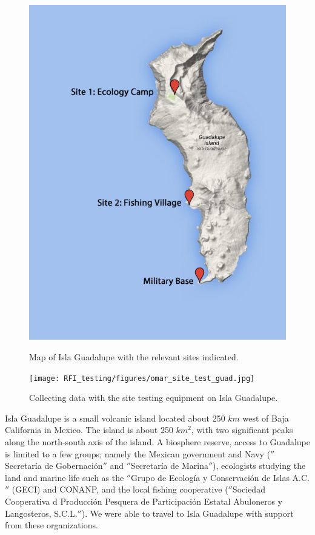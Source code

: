 \begin{figure}[htb]
\centering
\begin{minipage}[b]{0.47\textwidth}
\centering
\includegraphics[width=0.95\linewidth]{RFI_testing/figures/isla_guadalupe_site_map.jpg}
\caption{Map of Isla Guadalupe with the relevant sites indicated.}
\label{Fig:guadmap}
\end{minipage}%
\begin{minipage}[b]{0.02\textwidth}
\hspace{1cm}
\end{minipage}%
\begin{minipage}[b]{0.47\textwidth}
\centering
\texttt{[image: RFI\_testing/figures/omar\_site\_test\_guad.jpg]}
\caption{Collecting data with the site testing equipment on Isla Guadalupe.}
\label{Fig:guadsite}
\end{minipage}
\end{figure}

Isla Guadalupe is a small volcanic island located about 250 $km$ west of Baja California in Mexico. The island is about 250 $km^2$, with two significant peaks along the north-south axis of the island. A biosphere reserve, access to Guadalupe is limited to a few groups; namely the Mexican government and Navy ($''$Secretar\'{i}a de Gobernaci\'{o}n$''$ and $''$Secretar\'{i}a de Marina$''$), ecologists studying the land and marine life such as the $''$Grupo de Ecolog\'{i}a y Conservaci\'{o}n de Islas A.C.$''$ (GECI) and CONANP, and the local fishing cooperative ($''$Sociedad Cooperativa d Producci\'{o}n Pesquera de Participaci\'{o}n Estatal Abuloneros y Langosteros, S.C.L.$''$). We were able to travel to Isla Guadalupe with support from these organizations. 

